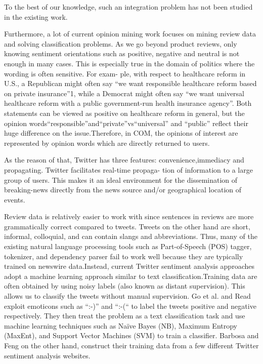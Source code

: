 \documentclass[twocolumn]{svjour3}          %
\begin{document}
To the best of our knowledge, such an integration problem has not been studied in the existing work.\cite{lu2008opinion}

Furthermore, a lot of current opinion mining work focuses on mining review data and solving classification problems. As we go beyond product reviews, only knowing sentiment orientations such as positive, negative and neutral is not enough in many cases. This is especially true in the domain of politics where the wording is often sensitive. For exam- ple, with respect to healthcare reform in U.S., a Republican might often say “we want responsible healthcare reform based on private insurance”1, while a Democrat might often say “we want universal healthcare reform with a public government-run health insurance agency”. Both statements can be viewed as positive on healthcare reform in general, but the opinion words“responsible”and“private”vs“universal” and “public” reflect their huge difference on the issue.Therefore, in COM, the opinions of interest are represented by opinion words which are directly returned to users.\cite{fang2012mining}

As the reason of that, Twitter has three features: convenience,immediacy and propagating.\cite{ikegami2013topic}
Twitter facilitates real-time propaga- tion of information to a large group of users. This makes it an ideal environment for the dissemination of breaking-news directly from the news source and/or geographical location of events.\cite{castillo2011information}

Review data is relatively easier to work with since sentences in reviews are more grammatically correct compared to tweets. Tweets on the other hand are short, informal, colloquial, and can contain slangs and abbreviations. Thus, many of the existing natural language processing tools such as Part-of-Speech (POS) tagger, tokenizer, and dependency parser fail to work well because they are typically trained on newswire data.Instead, current Twitter sentiment analysis approaches \cite{barbosa2010robust,davidov2010enhanced,go2009twitter,read2005using,saif2012alleviating} adopt a machine learning approach similar to text classification.Training data are often obtained by using noisy labels (also known as distant supervision). This allows us to classify the tweets without manual supervision. Go et al. \cite{go2009twitter} and Read \cite{read2005using} exploit emoticons such as “:-)” and “:-(“ to label the tweets positive and negative respectively. They then treat the problem as a text classification task and use machine learning techniques such as Naïve Bayes (NB), Maximum Entropy (MaxEnt), and Support Vector Machines (SVM) to train a classifier. Barbosa and Feng \cite{barbosa2010robust} on the other hand, construct their training data from a few different Twitter sentiment analysis websites.\cite{lek2013aspect}
\end{document}

